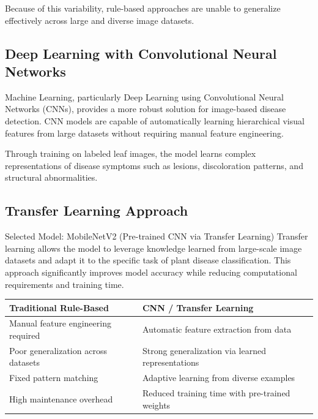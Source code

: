 \documentclass[12pt,a4paper]{article}
\begin{document}
Because of this variability, rule-based approaches are unable to generalize effectively across large and diverse image datasets.

\subsection{Deep Learning with Convolutional Neural Networks}

Machine Learning, particularly Deep Learning using Convolutional Neural Networks (CNNs), provides a more robust solution for image-based disease detection. CNN models are capable of automatically learning hierarchical visual features from large datasets without requiring manual feature engineering.

Through training on labeled leaf images, the model learns complex representations of disease symptoms such as lesions, discoloration patterns, and structural abnormalities.

\subsection{Transfer Learning Approach}

\begin{infobox}{Selected Model: MobileNetV2 (Pre-trained CNN via Transfer Learning)}
Transfer learning allows the model to leverage knowledge learned from large-scale image datasets and adapt it to the specific task of plant disease classification. This approach significantly improves model accuracy while reducing computational requirements and training time.
\end{infobox}

\vspace{10pt}

\begin{tabularx}{\textwidth}{>{\raggedright\arraybackslash}X >{\raggedright\arraybackslash}X}
  \toprule
  \rowcolor{primarynavy}
  \color{white}\textbf{Traditional Rule-Based} & \color{white}\textbf{CNN / Transfer Learning} \\
  \midrule
  \rowcolor{iceblue}
  Manual feature engineering required   & Automatic feature extraction from data \\
  Poor generalization across datasets   & Strong generalization via learned representations \\
  \rowcolor{iceblue}
  Fixed pattern matching               & Adaptive learning from diverse examples \\
  High maintenance overhead            & Reduced training time with pre-trained weights \\
  \bottomrule
\end{tabularx}
\end{document}
